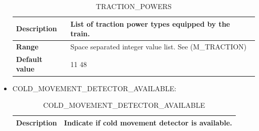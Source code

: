 \documentclass{template/openetcs}
\begin{document}
\begin{itemize}
			\begin{longtable}{|l|l|}
				\caption{TRACTION\_POWERS}\\ 
				\hline
				
					\begin{minipage}[t]{0.22\linewidth} \textbf{Description}	\end{minipage} 
				&	\begin{minipage}[t]{0.78\linewidth} List of traction power types equipped by the train. \end{minipage} \\
				
				\hline
																																									
					\begin{minipage}[t]{0.22\linewidth} \textbf{Range}	\end{minipage} 
				&	\begin{minipage}[t]{0.78\linewidth} Space separated integer value list. See (M\_TRACTION) \end{minipage} \\
				
				\hline
				
					\begin{minipage}[t]{0.22\linewidth} \textbf{Default value}	\end{minipage} 
				&	\begin{minipage}[t]{0.78\linewidth} 11 48 \end{minipage} \\
				
				\hline
				
			\end{longtable}

		\item COLD\_MOVEMENT\_DETECTOR\_AVAILABLE:
											
			\begin{longtable}{|l|l|}
				\caption{COLD\_MOVEMENT\_DETECTOR\_AVAILABLE}\\ 
				\hline
				
					\begin{minipage}[t]{0.22\linewidth} \textbf{Description}	\end{minipage} 
				&	\begin{minipage}[t]{0.78\linewidth} Indicate if cold movement detector is available. \end{minipage} \\
				
				\hline
																																									

\end{longtable}
\end{itemize}
\end{document}
